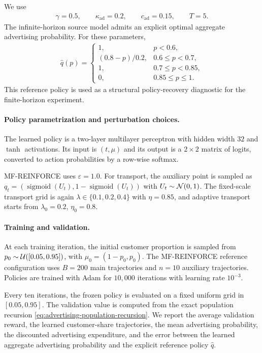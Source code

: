 We use
\begin{align}
    \gamma=0.5,
    \qquad
    \kappa_{\mathrm{ad}}=0.2,
    \qquad
    c_{\mathrm{ad}}=0.15,
    \qquad
    T=5.
\end{align}
The infinite-horizon source model admits an explicit optimal aggregate advertising probability. For these parameters,
\begin{align}
    \widehat q(p)
    =
    \begin{cases}
        1, & p<0.6,\\
        (0.8-p)/0.2, & 0.6\leq p<0.7,\\
        1, & 0.7\leq p<0.85,\\
        0, & 0.85\leq p\leq1.
    \end{cases}
\end{align}
This reference policy is used as a structural policy-recovery diagnostic for the finite-horizon experiment.

\paragraph{Policy parametrization and perturbation choices.}
The learned policy is a two-layer multilayer perceptron with hidden width $32$ and $\tanh$ activations. Its input is $(t,\mu)$ and its output is a $2\times2$ matrix of logits, converted to action probabilities by a row-wise softmax.

MF-REINFORCE uses $\varepsilon=1.0$. For transport, the auxiliary point is sampled as $q_t=(\operatorname{sigmoid}(U_t),1-\operatorname{sigmoid}(U_t))$ with $U_t\sim{\cal N}(0,1)$. The fixed-scale transport grid is again $\lambda\in\{0.1,0.2,0.4\}$ with $\eta=0.85$, and adaptive transport starts from $\lambda_0=0.2$, $\eta_0=0.8$.

\paragraph{Training and validation.}
At each training iteration, the initial customer proportion is sampled from $p_0\sim{\cal U}([0.05,0.95])$, with $\mu_0=(1-p_0,p_0)$. The MF-REINFORCE reference configuration uses $B=200$ main trajectories and $n=10$ auxiliary trajectories. Policies are trained with Adam for $10{,}000$ iterations with learning rate $10^{-3}$.

Every ten iterations, the frozen policy is evaluated on a fixed uniform grid in $[0.05,0.95]$. The validation value is computed from the exact population recursion \eqref{eq:advertising-population-recursion}. We report the average validation reward, the learned customer-share trajectories, the mean advertising probability, the discounted advertising expenditure, and the error between the learned aggregate advertising probability and the explicit reference policy $\widehat q$.

